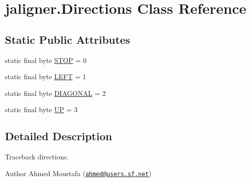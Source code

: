\hypertarget{classjaligner_1_1_directions}{\section{jaligner.\+Directions Class Reference}
\label{classjaligner_1_1_directions}
}
\subsection*{Static Public Attributes}
\begin{DoxyCompactItemize}
\item 
static final byte \hyperlink{classjaligner_1_1_directions_a24db3cae78d4158c169ebdd937bff01a}{S\+T\+O\+P} = 0
\item 
static final byte \hyperlink{classjaligner_1_1_directions_a3801d5f4bc1ebfc890758da247698bf0}{L\+E\+F\+T} = 1
\item 
static final byte \hyperlink{classjaligner_1_1_directions_a9f723e9707ba7ca711e90767ecb5cf14}{D\+I\+A\+G\+O\+N\+A\+L} = 2
\item 
static final byte \hyperlink{classjaligner_1_1_directions_ab655b12c1886668fffbe8e75db80bea2}{U\+P} = 3
\end{DoxyCompactItemize}


\subsection{Detailed Description}
Traceback directions.

\begin{DoxyAuthor}{Author}
Ahmed Moustafa (\href{mailto:ahmed@users.sf.net}{\tt ahmed@users.\+sf.\+net}) 
\end{DoxyAuthor}


